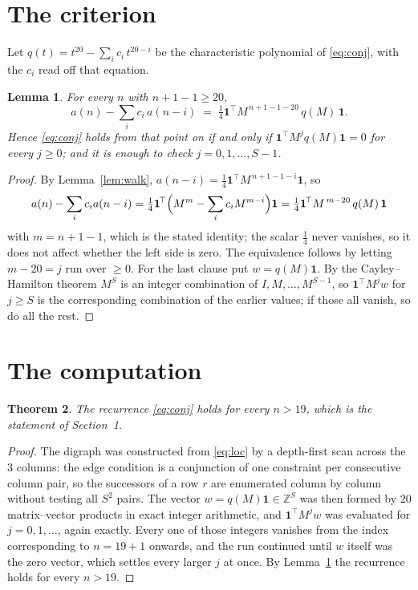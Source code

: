 \documentclass[11pt,a4paper]{article}
\theoremstyle{plain}
\newtheorem{theorem}{Theorem}
\newtheorem{lemma}[theorem]{Lemma}
\theoremstyle{definition}
\begin{document}
\section{The criterion}

Let $q(t)=t^{20}-\sum_i c_i\,t^{20-i}$ be the characteristic polynomial of
\eqref{eq:conj}, with the $c_i$ read off that equation.

\begin{lemma}\label{lem:crit}
For every $n$ with $n+1-1\ge20$,
\[
a(n)-\sum_i c_i\,a(n-i)\;=\;\tfrac1{4}\mathbf{1}^{\!\top}M^{\,n+1-1-20}\,q(M)\,\mathbf{1} .
\]
Hence \eqref{eq:conj} holds from that point on if and only if
$\mathbf{1}^{\!\top}M^{j}q(M)\mathbf{1}=0$ for every $j\ge0$; and it is enough to check
$j=0,1,\dots,S-1$.
\end{lemma}

\begin{proof}
By Lemma~\ref{lem:walk}, $a(n-i)=\tfrac1{4}\mathbf{1}^{\!\top}M^{\,n+1-1-i}\mathbf{1}$, so
\[
a(n)-\sum_i c_i a(n-i)
=\tfrac1{4}\mathbf{1}^{\!\top}\Bigl(M^{m}-\sum_i c_i M^{m-i}\Bigr)\mathbf{1}
=\tfrac1{4}\mathbf{1}^{\!\top}M^{\,m-20}\,q(M)\,\mathbf{1}
\]
with $m=n+1-1$, which is the stated identity; the scalar $\tfrac1{4}$ never vanishes, so
it does not affect whether the left side is zero. The equivalence follows by letting
$m-20=j$ run over $\ge0$. For the last clause put $w=q(M)\mathbf{1}$. By the
Cayley--Hamilton theorem $M^{S}$ is an integer combination of $I,M,\dots,M^{S-1}$, so
$\mathbf{1}^{\!\top}M^{j}w$ for $j\ge S$ is the corresponding combination of the earlier
values; if those all vanish, so do all the rest.
\end{proof}

\section{The computation}

\begin{theorem}
The recurrence \eqref{eq:conj} holds for every $n>19$, which is the statement of
Section~1.
\end{theorem}

\begin{proof}
The digraph was constructed from \eqref{eq:loc} by a depth-first scan across the $3$
columns: the edge condition is a conjunction of one constraint per consecutive column
pair, so the successors of a row $r$ are enumerated column by column without testing all
$S^2$ pairs. The vector $w=q(M)\mathbf{1}\in\mathbb{Z}^{S}$ was then formed by $20$
matrix--vector products in exact integer arithmetic, and $\mathbf{1}^{\!\top}M^{j}w$ was
evaluated for $j=0,1,\dots$, again exactly. Every one of those integers vanishes from the
index corresponding to $n=19+1$ onwards, and the run continued until $w$ itself was the
zero vector, which settles every larger $j$ at once. By Lemma~\ref{lem:crit} the recurrence
holds for every $n>19$.
\end{proof}
\end{document}
